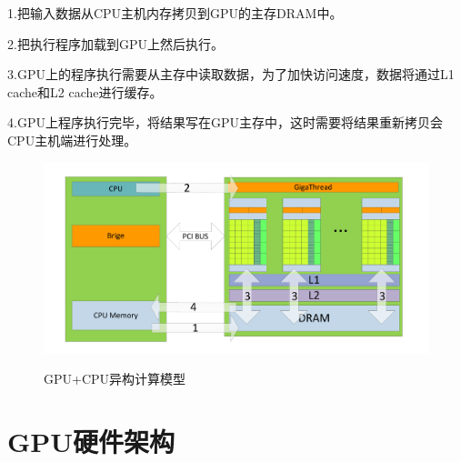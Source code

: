 1.把输入数据从CPU主机内存拷贝到GPU的主存DRAM中。

2.把执行程序加载到GPU上然后执行。

3.GPU上的程序执行需要从主存中读取数据，为了加快访问速度，数据将通过L1 cache和L2 cache进行缓存。

4.GPU上程序执行完毕，将结果写在GPU主存中，这时需要将结果重新拷贝会CPU主机端进行处理。
\begin{figure}
\setlength{\belowcaptionskip}{-0.5cm}
  \begin{center}
    {\includegraphics[width=1 \textwidth]{figures/yigou.pdf}}
    \end{center}
  \caption{{\footnotesize{GPU+CPU异构计算模型}}}
  \label{GCY}
\end{figure}
\section{GPU硬件架构}

